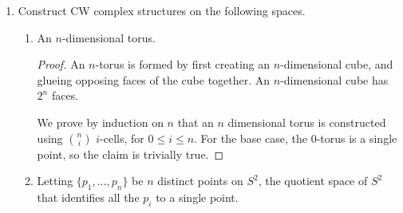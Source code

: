 \documentclass{article}
\begin{document}
\begin{enumerate}
\begin{enumerate}
\begin{proof}
          By similar argument, any subset of $P$ must also be closed in
          $X$, which means that $P$ as a subset of $X$ has the discrete
          topology. Yet, $P$ is infinite, so it cannot be compact, which is
          a contradiction because $P$ is a closed subset of a compact space
          $C$, and should be compact.
        \end{proof}
    \end{enumerate}

  \item Construct CW complex structures on the following spaces.
    \begin{enumerate}
      \item An $n$-dimensional torus.
        \begin{proof}
          An $n$-torus is formed by first creating an $n$-dimensional cube,
          and glueing opposing faces of the cube together. An
          $n$-dimensional cube has $2^n$ faces.

          We prove by induction on $n$ that an $n$ dimensional torus is
          constructed using $\binom ni$ $i$-cells, for $0\leq i\leq n$. For
          the base case, the $0$-torus is a single point, so the claim is
          trivially true.
        \end{proof}

      \item Letting $\{p_1,\ldots,p_n\}$ be $n$ distinct points on $S^2$,
        the quotient space of $S^2$ that identifies all the $p_i$ to a
        single point.
    \end{enumerate}
\end{enumerate}
\end{document}
